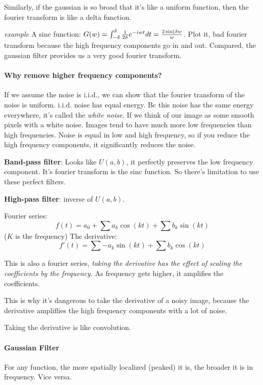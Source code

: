 Similarly, if the gaussian is so broad that it's like a uniform function, then
the fourier transform is like a delta function.

\emph{example} A sinc function: $G(w) = \int_{-\delta}^\delta \frac{1}{2\delta} e^{-iwt}
dt = \frac{2\sin(\delta w}{w}$. Plot it, bad fourier transform because
the high frequency components go in and out.
Compared, the gaussian filter provides us a very good fourier
transform.

\paragraph{Why remove  higher frequency components?}
\label{sec:why-remove-higher}
If we assume the noise is i.i.d., we can show that the fourier
transform of the noise is uniform. i.i.d. noise has equal energy. Bc
this noise has the same energy everywhere, it's called the \emph{white
noise}. If we think of our image as some smooth pixels with a white noise.
Images tend to have much more low frequencies than high
frequencies. Noise is equal in low and high frequency, so if you
reduce the high frequency components, it significantly reduces the
noise. 

\textbf{Band-pass filter}: Looks like $U(a,b)$, it perfectly preserves
the low frequency component. It's fourier transform is the sinc
function. So there's limitation to use these perfect filters.

\textbf{High-pass filter}: inverse of $U(a,b)$. 

Fourier series: $$f(t) = a_0 + \sum a_k \cos(k t) + \sum b_k
\sin(k t)$$ ($K$ is the frequency)
The derivative:$$f'(t) = \sum - a_k \sin(k t) + \sum b_k
\cos(k t)$$

This is also a fourier series, \emph{taking the derivative has the
effect of scaling the coefficients by the frequency.} As frequency gets
higher, it amplifies the coefficients. 

This is why it's dangerous to take the derivative of a noisy image,
because the derivative ampliflies the high frequency components with a
lot of noise. 

Taking the derivative is like convolution.

\paragraph{Gaussian Filter}
\label{sec:gaussian-filter}
For any function, the more spatially localized (peaked) it is, the
broader it is in frequency. Vice versa.

\pagebreak
\pagebreak
\pagebreak
\pagebreak

